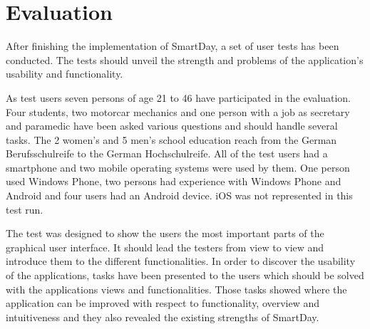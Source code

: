 \chapter{Evaluation}
\label{cha:evaluation}
After finishing the implementation of SmartDay, a set of user tests has been conducted. The tests should unveil the strength and problems of the application's usability and functionality.

As  test users seven persons of age 21 to 46 have participated in the evaluation. Four students, two motorcar mechanics and one person with a job as secretary and paramedic have been asked various questions and should handle several tasks. The 2 women's and 5 men's school education reach from the German Berufsschulreife to the German Hochschulreife. All of the test users had a smartphone and two mobile operating systems were used by them. One person used Windows Phone, two persons had experience with Windows Phone and Android and four users had an Android device. iOS was not represented in this test run.

The  test was designed to show the users the most important parts of the graphical user interface. It should lead the testers from view to view and introduce them to the different functionalities. In order to discover the usability of the applications, tasks have been presented to the users which should be solved with the applications views and functionalities. Those tasks showed where the application can be improved with respect to functionality, overview and intuitiveness and they also revealed the existing strengths of SmartDay.

